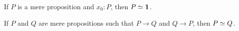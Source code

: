 \documentclass[hott-all.tex]{subfiles}
\begin{document}
\begin{lem}\label{thm:inhabprop-eqvunit}
  If $P$ is a mere proposition and $x_0:P$, then $P \simeq \mathbf{1}$.
\end{lem}
%

\begin{lem}\label{lem:equiv-iff-hprop}
  If $P$ and $Q$ are mere propositions such that $P\to Q$ and $Q\to P$, then $P \simeq Q$.
\end{lem}
%
%
%
%
%
\end{document}
